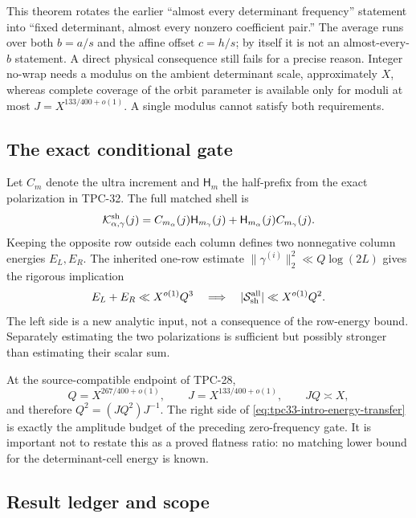 This theorem rotates the earlier ``almost every determinant frequency''
statement into ``fixed determinant, almost every nonzero coefficient pair.''
The average runs over both \(b=a/s\) and the affine offset \(c=h/s\); by
itself it is not an almost-every-\(b\) statement.  A
direct physical consequence still fails for a precise reason.  Integer
no-wrap needs a modulus on the ambient determinant scale, approximately
\(X\), whereas complete coverage of the orbit parameter is available only
for moduli at most \(J=X^{133/400+o(1)}\).  A single modulus cannot satisfy
both requirements.

\subsection{The exact conditional gate}

Let \(C_m\) denote the ultra increment and \(\mathsf H_m\) the half-prefix
from the exact polarization in TPC-32.  The full matched shell is
\begin{equation}
 \mathcal K^{\rm sh}_{\alpha,\gamma}(j)
 =C_{m_\alpha}(j)\mathsf H_{m_\gamma}(j)
  +\mathsf H_{m_\alpha}(j)C_{m_\gamma}(j).
 \label{eq:tpc33-intro-polarization}
\end{equation}
Keeping the opposite row outside each column defines two nonnegative
column energies \(E_L,E_R\).  The inherited one-row estimate
\(\|\gamma^{(i)}\|_2^2\ll Q\log(2L)\) gives the rigorous implication
\begin{equation}
 E_L+E_R\ll X^{o(1)}Q^3
 \quad\Longrightarrow\quad
 |\mathcal S_{\rm sh}^{\rm all}|\ll X^{o(1)}Q^2.
 \label{eq:tpc33-intro-energy-transfer}
\end{equation}
The left side is a new analytic input, not a consequence of the row-energy
bound.  Separately estimating the two polarizations is sufficient but
possibly stronger than estimating their scalar sum.

At the source-compatible endpoint of TPC-28,
\begin{equation}
 Q=X^{267/400+o(1)},\qquad
 J=X^{133/400+o(1)},\qquad
 JQ\asymp X,
 \label{eq:tpc33-intro-high-beta}
\end{equation}
and therefore \(Q^2=(JQ^2)J^{-1}\).  The right side of
\eqref{eq:tpc33-intro-energy-transfer} is exactly the amplitude budget of
the preceding zero-frequency gate.  It is important not to restate this as
a proved flatness ratio: no matching lower bound for the determinant-cell
energy is known.

\subsection{Result ledger and scope}

